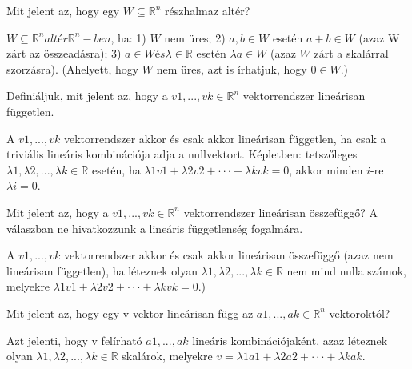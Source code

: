 \begin{frame}
  \begin{tcolorbox}[title={1}]
      Mit jelent az, hogy egy $W {\subseteq} \mathbb{R}^n$ részhalmaz altér?

  \tcblower
$W {\subseteq} \mathbb{R}^n altér \mathbb{R}^n-ben$, ha: 1) $W$ nem üres; 2) $a,b \in W$ esetén $a + b \in W$ (azaz W zárt az összeadásra); 3) $a \in W és {\lambda} \in \mathbb{R}$ esetén ${\lambda}a \in W$ (azaz $W$ zárt a skalárral szorzásra). (Ahelyett, hogy $W$ nem üres, azt is írhatjuk, hogy $0 \in W$.)
  \end{tcolorbox}
\end{frame}


\begin{frame}
  \begin{tcolorbox}[title={2}]
      Definiáljuk, mit jelent az, hogy a $v1,...,vk \in \mathbb{R}^n$ vektorrendszer lineárisan független.

  \tcblower
A $v1,...,vk$ vektorrendszer akkor és csak akkor lineárisan független, ha csak a triviális lineáris kombinációja adja a nullvektort. Képletben: tetszőleges ${\lambda}1,{\lambda}2,...,{\lambda}k \in \mathbb{R}$ esetén, ha ${\lambda}1v1 + {\lambda}2v2 +  \cdot  \cdot  \cdot  + {\lambda}kvk = 0$, akkor minden $i$-re ${\lambda}i = 0$.
  \end{tcolorbox}
\end{frame}


\begin{frame}
  \begin{tcolorbox}[title={3}]
      Mit jelent az, hogy a $v1,...,vk \in \mathbb{R}^n$ vektorrendszer lineárisan összefüggő? A válaszban ne hivatkozzunk a lineáris függetlenség fogalmára.


  \tcblower
A $v1,...,vk$ vektorrendszer akkor és csak akkor lineárisan összefüggő (azaz nem lineárisan független), ha léteznek olyan ${\lambda}1,{\lambda}2,...,{\lambda}k \in \mathbb{R}$ nem mind nulla számok, melyekre ${\lambda}1v1 + {\lambda}2v2 +  \cdot  \cdot  \cdot  + {\lambda}kvk = 0$.)

  \end{tcolorbox}
\end{frame}

\begin{frame}
  \begin{tcolorbox}[title={4}]
     Mit jelent az, hogy egy v vektor lineárisan függ az $a1,...,ak \in \mathbb{R}^n$ vektoroktól?

  \tcblower
Azt jelenti, hogy v felírható $a1,...,ak$ lineáris kombinációjaként, azaz léteznek olyan ${\lambda}1,{\lambda}2,...,{\lambda}k \in \mathbb{R}$ skalárok, melyekre $v = {\lambda}1a1 + {\lambda}2a2 +  \cdot  \cdot  \cdot  + {\lambda}kak$.
  \end{tcolorbox}
\end{frame}



